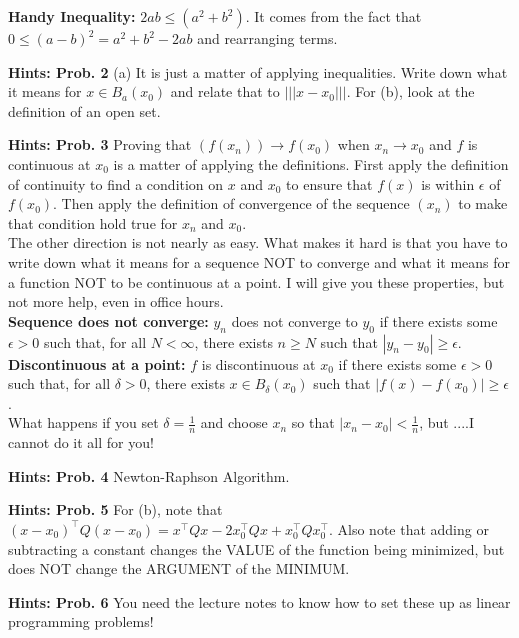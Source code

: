 \documentclass[letterpaper]{article}
\begin{document}
\textbf{Handy Inequality:} $2ab\le\left(a^{2}+b^{2}\right).$ It comes from the fact that $0 \le (a-b)^2 = a^2 + b^2 - 2ab$ and rearranging terms.

\vspace{1cm}

\noindent \textbf{Hints: Prob. 2 } (a) It is just a matter of applying inequalities. Write down what it means for $ x\in B_a(x_0)$ and relate that to $|||x-x_0|||$.
For (b), look at the definition of an open set.

\vspace{1cm}

\noindent \textbf{Hints: Prob. 3} Proving that $(f(x_n)) \rightarrow f(x_0)$ when  $x_n \rightarrow x_0$ and $f$ is continuous at $x_0$ is a matter of applying the definitions. First apply the definition of continuity to find a condition on $x$ and $x_0$ to ensure that $f(x)$ is within $\epsilon$ of $f(x_0)$. Then apply the definition of convergence of the sequence $(x_n)$ to make that condition hold true for $x_n$ and $x_0$. \\

The other direction is not nearly as easy. What makes it hard is that you have to write down what it means for a sequence NOT to converge and what it means for a function NOT to be continuous at a point. I will give you these properties, but not more help, even in office hours.\\


\textbf{Sequence does not converge:} $y_n$ does not converge to $y_0$ if  there exists some $\epsilon >0$ such that, for all $N < \infty$, there exists $n \ge N$ such that $|y_n -  y_0| \ge \epsilon$.\\

\textbf{Discontinuous at a point:} $f$ is discontinuous at $x_0$ if there exists some $\epsilon >0$ such that, for all $\delta>0$, there exists $x \in B_{\delta}(x_0)$ such that $|f(x) - f(x_0)| \ge \epsilon$. \\

What happens if you set $\delta = \frac{1}{n}$ and choose $x_n$ so that $|x_n-x_0 |< \frac{1}{n}$, but ....I cannot do it all for you!

\vspace{1cm}

\noindent \textbf{Hints: Prob. 4 } Newton-Raphson Algorithm.

\vspace{1cm}

\noindent \textbf{Hints: Prob. 5 }  For (b), note that $(x-x_0)^\top Q (x-x_0) = x^\top Q x - 2 x_0^\top Qx + x_0^\top Q x_0^\top$. Also note that adding or subtracting a constant changes the VALUE of the function being minimized, but does NOT change the ARGUMENT of the MINIMUM.

\vspace{1cm}

\noindent \textbf{Hints: Prob. 6 } You need the lecture notes to know how to set these up as linear programming problems!

\vspace{1cm}
\end{document}
